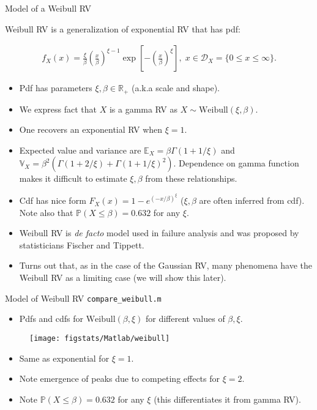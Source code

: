 \documentclass[9pt]{beamer}
\begin{document}
%
\begin{frame}{Model of a Weibull RV}

Weibull RV is a generalization of exponential RV that has pdf:
\begin{block}{}
\begin{align*}
f_X(x)=\frac{\xi}{\beta}\left(\frac{x}{\beta}\right)^{\xi-1}\exp\left[{-\left(\frac{x}{\beta}\right)^\xi}\right],\; x\in \mathcal{D}_X=\{0\leq x\leq \infty\}.
\end{align*}
\end{block}
\begin{itemize}
\setlength{\itemsep}{5pt}
\item Pdf has parameters $\xi,\beta\in \mathbb{R}_+$ (a.k.a scale and shape).
\item We express fact that $X$ is a gamma RV as $X\sim \textrm{Weibull}(\xi,\beta)$.
\item One recovers an exponential RV when $\xi=1$. 
\item Expected value and variance are $\mathbb{E}_X=\beta\Gamma(1+1/\xi)$ and $\mathbb{V}_X=\beta^2\left(\Gamma(1+2/\xi)+\Gamma(1+1/\xi)^2\right)$. Dependence on gamma function makes it difficult to estimate $\xi,\beta$ from these relationships. 
\item Cdf has nice form $F_X(x)=1-e^{(-x/\beta)^\xi}$ ($\xi,\beta$ are often inferred from cdf). Note also that $\mathbb{P}(X\leq \beta)=0.632$ for any $\xi$. 
\item Weibull RV is {\em de facto} model used in failure analysis and was proposed by statisticians Fischer and Tippett. 
\item Turns out that, as in the case of the Gaussian RV, many phenomena have the Weibull RV as a limiting case (we will show this later). 
\end{itemize}

\end{frame}

%
\begin{frame}{Model of Weibull RV \footnotesize{\texttt{compare\_weibull.m}}}
\begin{itemize}
\item Pdfs and cdfs for $\textrm{Weibull}(\beta,\xi)$ for different values of $\beta,\xi$.
\end{itemize}
\begin{figure}[!htb]
    \centering
	\texttt{[image: figstats/Matlab/weibull]}
\end{figure}
\begin{itemize}
\item Same as exponential for $\xi=1$.
\item Note emergence of peaks due to competing effects for $\xi=2$. 
\item Note $\mathbb{P}(X\leq \beta)=0.632$ for any $\xi$ (this differentiates it from gamma RV).
\end{itemize}
\end{frame}
\end{document}
